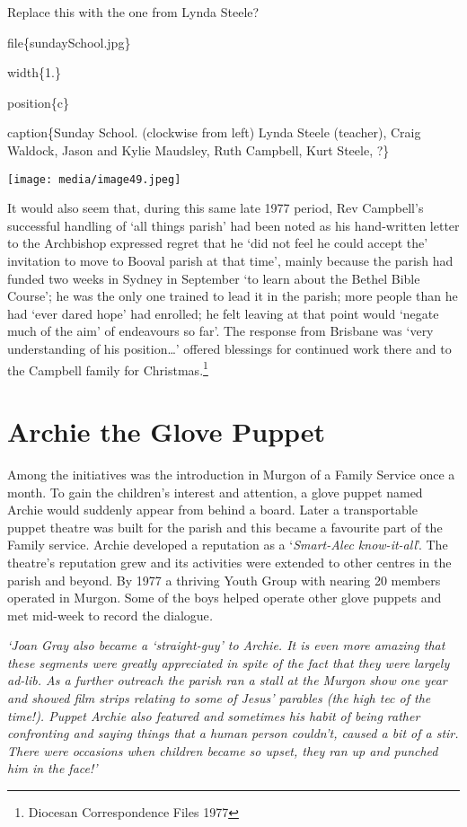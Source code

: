 Replace this with the one from Lynda Steele?

file\{sundaySchool.jpg\}

width\{1.\}

position\{c\}

caption\{Sunday School. (clockwise from left) Lynda Steele (teacher), Craig Waldock, Jason and Kylie Maudsley, Ruth Campbell, Kurt Steele, ?\}

\texttt{[image: media/image49.jpeg]}

It would also seem that, during this same late 1977 period, Rev Campbell's successful handling of `all things parish' had been noted as his hand-written letter to the Archbishop expressed regret that he `did not feel he could accept the' invitation to move to Booval parish at that time', mainly because the parish had funded two weeks in Sydney in September `to learn about the Bethel Bible Course'; he was the only one trained to lead it in the parish; more people than he had `ever dared hope' had enrolled; he felt leaving at that point would `negate much of the aim' of endeavours so far'. The response from Brisbane was `very understanding of his position\ldots' offered blessings for continued work there and to the Campbell family for Christmas.\footnote{Diocesan Correspondence Files 1977}

\hypertarget{archie-the-glove-puppet}{%
\section{Archie the Glove Puppet}\label{archie-the-glove-puppet}}

Among the initiatives was the introduction in Murgon of a Family Service once a month. To gain the children's interest and attention, a glove puppet named Archie would suddenly appear from behind a board. Later a transportable puppet theatre was built for the parish and this became a favourite part of the Family service. Archie developed a reputation as a `\emph{Smart-Alec know-it-all}'. The theatre's reputation grew and its activities were extended to other centres in the parish and beyond. By 1977 a thriving Youth Group with nearing 20 members operated in Murgon. Some of the boys helped operate other glove puppets and met mid-week to record the dialogue\emph{.}

\emph{`Joan Gray also became a `straight-guy' to Archie. It is even more amazing that these segments were greatly appreciated in spite of the fact that they were largely ad-lib. As a further outreach the parish ran a stall at the Murgon show one year and showed film strips relating to some of Jesus' parables (the high tec of the time!). Puppet Archie also featured and sometimes his habit of being rather confronting and saying things that a human person couldn't, caused a bit of a stir. There were occasions when children became so upset, they ran up and punched him in the face!'}

